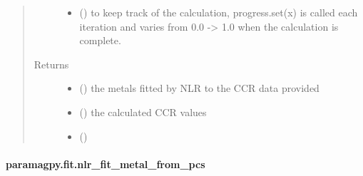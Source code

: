\documentclass[a4paper,10pt,english,openany,oneside]{sphinxmanual}
\begin{document}
\begin{fulllineitems}
\begin{quote}
\begin{description}
\begin{itemize}
\item {} 
 (\sphinxstyleliteralemphasis{\sphinxupquote{, }}) \textendash{} to keep track of the calculation, progress.set(x) is called each
iteration and varies from 0.0 -\textgreater{} 1.0 when the calculation is complete.

\end{itemize}

\item[{Returns}] \leavevmode
\begin{itemize}
\item {} 
 () \textendash{} the metals fitted by NLR to the CCR data provided

\item {} 
 () \textendash{} the calculated CCR values

\item {} 
 ()

\end{itemize}


\end{description}\end{quote}

\end{fulllineitems}



\paragraph{paramagpy.fit.nlr\_fit\_metal\_from\_pcs}
\label{\detokenize{reference/generated/paramagpy.fit.nlr_fit_metal_from_pcs:paramagpy-fit-nlr-fit-metal-from-pcs}}\label{\detokenize{reference/generated/paramagpy.fit.nlr_fit_metal_from_pcs::doc}}
\end{document}
